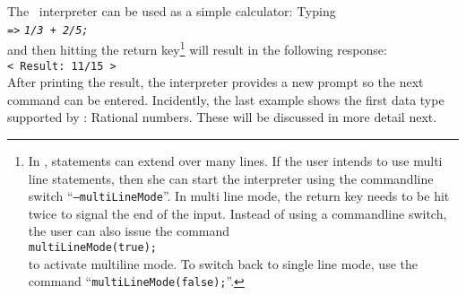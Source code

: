 \noindent
The \setlx\  interpreter can be used as a simple calculator:
Typing 
\\[0.2cm]
\hspace*{1.3cm}
\texttt{=>} \texttt{\textsl{1/3 + 2/5;}}
\\[0.2cm]
and then hitting the return key\footnote{
In \setlx, statements can extend over many lines.  If the user intends to use multi line
statements, then she can start the interpreter using the commandline switch ``\texttt{--multiLineMode}''.
In multi line mode, the return key needs to be hit twice to signal
the end of the input.  Instead of using a commandline switch, the user can also issue the command
\\
\hspace*{1.3cm}
\texttt{multiLineMode(true);}
\\
to activate multiline mode.
To switch back to single line mode, use the command ``\texttt{multiLineMode(false);}''.
} 
will result in the following response:
\\[0.2cm]
\hspace*{1.3cm}
\texttt{< Result: 11/15 >}
\\[0.2cm]
After printing the result, the interpreter provides a new prompt so the next command can
be entered.  Incidently, the last 
example shows the first data type supported by \setlx: Rational numbers. These will be discussed in
more detail next.


